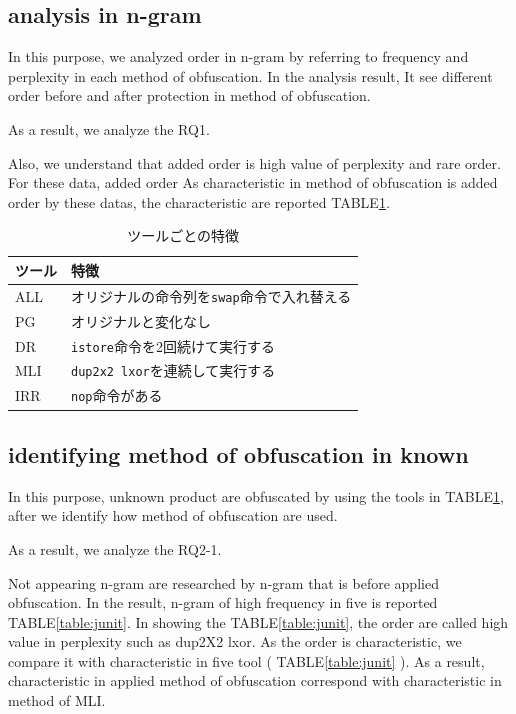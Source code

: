 \documentclass[conference]{IEEEtran}
\begin{document}
\subsection{analysis in n-gram}

In this purpose, we analyzed order in n-gram by referring to frequency
and perplexity in each method of obfuscation.  In the analysis result,
It see different order before and after protection in method of
obfuscation.

As a result, we analyze the RQ1.

Also, we understand that added order is high value of perplexity and
rare order.  For these data, added order As characteristic in method
of obfuscation is added order by these datas, the characteristic are
reported TABLE\ref{table:features}.



\begin{table}[t]
  \centering
  \footnotesize{
    \caption{ツールごとの特徴}\label{table:features}
  \begin{tabular}{l|l}
    ツール              & 特徴　\\ \hline
    ALL & オリジナルの命令列を\texttt{swap}命令で入れ替える \\
    PG  & オリジナルと変化なし \\
    DR  & \texttt{istore}命令を2回続けて実行する \\
    MLI & \texttt{dup2x2 lxor}を連続して実行する \\
    IRR & \texttt{nop}命令がある \\
  \end{tabular}}
\end{table}


\subsection{identifying method of obfuscation in known}

In this purpose, unknown product are obfuscated by using the tools in
TABLE\ref{table:features}, after we identify how method of obfuscation
are used.

As a result, we analyze the RQ2-1.

Not appearing n-gram are researched by n-gram that is before applied
obfuscation.  In the result, n-gram of high frequency in five is
reported TABLE\ref{table:junit}.  In showing the
TABLE\ref{table:junit}, the order are called high value in perplexity
such as dup2X2 lxor.  As the order is characteristic, we compare it
with characteristic in five tool ( TABLE\ref{table:junit} ).  As a
result, characteristic in applied method of obfuscation correspond
with characteristic in method of MLI.
\end{document}
